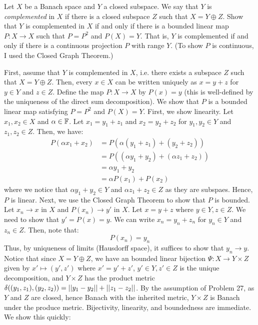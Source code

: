 \documentclass[12pt]{article}
\begin{document}
\begin{problem}{2}
    Let $X$ be a Banach space and $Y$ a closed subspace. We say that $Y$ is \emph{complemented} in $X$ if there is a closed subspace $Z$ such that $X = Y \oplus Z$. Show that $Y$ is complemented in $X$ if and only if there is a bounded linear map $P : X \to X$ such that $P = P^2$ and $P(X) = Y$. That is, $Y$ is complemented if and only if there is a continuous projection $P$ with range $Y$. (To show $P$ is continuous, I used the Closed Graph Theorem.)
\end{problem}
\begin{solution}
    First, assume that $Y$ is complemented in $X$, i.e. there exists a subspace $Z$ such that $X = Y \oplus Z$. Then, every $x \in X$ can be written uniquely as $x = y+z$ for $y \in Y$ and $z \in Z$. Define the map $P: X \to X$ by $P(x) = y$ (this is well-defined by the uniqueness of the direct sum decomposition). We show that $P$ is a bounded linear map satisfying $P = P^2$ and $P(X) = Y$. \bbni
    First, we show linearity. Let $x_1, x_2 \in X$ and $\alpha \in \mathbb F$. Let $x_1 = y_1 + z_1$ and $x_2 = y_2 + z_2$ for $y_1, y_2 \in Y$ and $z_1, z_2 \in Z$. Then, we have:
    \begin{align*}
        P(\alpha x_1 + x_2) &= P(\alpha(y_1 + z_1) + (y_2 + z_2)) \\
        &= P((\alpha y_1 + y_2)+(\alpha z_1 + z_2)) \\
        &= \alpha y_1 + y_2 \\
        &= \alpha P(x_1) + P(x_2)
    \end{align*}
    where we notice that $\alpha y_1 + y_2 \in Y$ and $\alpha z_1 + z_2 \in Z$ as they are subspaes. Hence, $P$ is linear. \bbni
    Next, we use the Closed Graph Theorem to show that $P$ is bounded. Let $x_n \to x$ in $X$ and $P(x_n) \to y'$ in $X$. Let $x = y+z$ where $y \in Y, z \in Z$. We need to show that $y' = P(x) = y$. We can write $x_n = y_n + z_n$ for $y_n \in Y$ and $z_n \in Z$. Then, note that:
    \[ P(x_n) = y_n \]
    Thus, by uniqueness of limits (Hausdorff space), it suffices to show that $y_n \to y$. Notice that since $X = Y \oplus Z$, we have an bounded linear bijection $\Psi: X \to Y \times Z$ given by $x' \mapsto (y', z')$ where $x' = y'+z'$, $y' \in Y, z' \in Z$ is the unique decomposition, and $Y \times Z$ has the product metric $\delta((y_1, z_1), (y_2, z_2)) = \left\vert\left\vert y_1 - y_2\right\vert\right\vert + \left\vert\left\vert z_1 - z_2\right\vert\right\vert$. By the assumption of Problem 27, as $Y$ and $Z$ are closed, hence Banach with the inherited metric, $Y \times Z$ is Banach under the produce metric. Bijectivity, linearity, and boundedness are immediate. We show this quickly: 

\end{solution}
\end{document}
